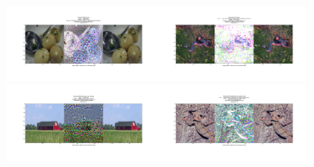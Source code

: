 \begin{frame}
 \begin{figure}[H]
\label{lbfgsis}
\includegraphics[trim=200 185 100 200, clip, width=5cm]{2019-04-10-adverse/imnet_examples/vgg16-ILSVRC2012_val_00039098-O722-A965-attack_summary.png}\includegraphics[trim=200 185 100 200, clip, width=5cm]{2019-04-10-adverse/imnet_examples/vgg16-ILSVRC2012_val_00027142-O52-A347-attack_summary.png}
\includegraphics[trim=200 185 100 200, clip, width=5cm]{2019-04-10-adverse/imnet_examples/vgg16-ILSVRC2012_val_00029901-O425-A468-attack_summary.png}\includegraphics[trim=200 185 100 200, clip, width=5cm]{2019-04-10-adverse/imnet_examples/ILSVRC2012_val_00001375-Otensor([42])-A694-attack_summary.png}
\end{figure}   
\end{frame}
